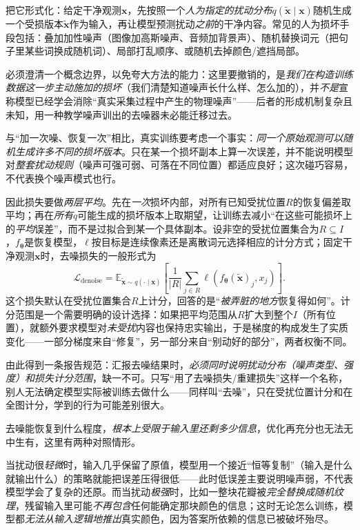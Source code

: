 把它形式化：给定干净观测$\bm{x}$，先按照一个\emph{人为指定的扰动分布}$q(\widetilde{\bm{x}}\mid\bm{x})$随机生成一个受损版本$\widetilde{\bm{x}}$作为输入，再让模型预测扰动\emph{之前}的干净内容。常见的人为损坏手段包括：叠加加性噪声（图像加高斯噪声、音频加背景声）、随机替换词元（把句子里某些词换成随机词）、局部打乱顺序、或随机去掉颜色/遮挡局部。

必须澄清一个概念边界，以免夸大方法的能力：这里要撤销的，是\emph{我们在构造训练数据这一步主动施加的损坏}（我们清楚知道噪声长什么样、怎么加的），并\emph{不是}宣称模型已经学会消除“真实采集过程中产生的物理噪声”——后者的形成机制复杂且未知，用一种教学噪声训出的去噪器未必能迁移过去。

与“加一次噪、恢复一次”相比，真实训练要考虑一个事实：\emph{同一个原始观测可以随机生成许多不同的损坏版本}。只在某一个损坏副本上算一次误差，并不能说明模型对\emph{整套扰动规则}（噪声可强可弱、可落在不同位置）都适应良好；这次碰巧容易，不代表换个噪声模式也行。

因此损失要做\emph{两层平均}。先在\emph{一次}损坏内部，对所有已知受扰位置$R$的恢复偏差取平均；再在\emph{所有}$q$可能生成的损坏版本上取期望，让训练去减小“在这些可能损坏上的\emph{平均}误差”，而不是过拟合到某一个具体副本。设非空的受扰位置集合为$R\subseteq I$，$f_{\bm{\theta}}$是恢复模型，$\ell$按目标是连续像素还是离散词元选择相应的计分方式；固定干净观测$\bm{x}$时，去噪损失的一般形式为
\begin{equation}
  \mathcal{L}_{\mathrm{denoise}}
  =\mathbb{E}_{\widetilde{\bm{x}}\sim q(\cdot\mid\bm{x})}
   \left[\frac{1}{|R|}\sum_{j\in R}\ell\!\left(f_{\bm{\theta}}(\widetilde{\bm{x}})_j,x_j\right)\right].
  \label{eq:data-derived-knowledge-denoising}
\end{equation}
这个损失默认在受扰位置集合$R$上计分，回答的是“\emph{被弄脏的地方}恢复得如何”。计分范围是一个需要明确的设计选择：如果把平均范围从$R$扩大到整个$I$（所有位置），就额外要求模型对\emph{未受扰}内容也保持忠实输出，于是梯度的构成发生了实质变化——一部分梯度来自“修复”，另一部分来自“别动好的部分”，两者权衡不同。

由此得到一条报告规范：汇报去噪结果时，\emph{必须同时说明扰动分布（噪声类型、强度）和损失计分范围}，缺一不可。只写“用了去噪损失/重建损失”这样一个名称，别人无法确定模型实际被训练去做什么——同样叫“去噪”，只在受扰位置计分和在全图计分，学到的行为可能差别很大。

去噪能恢复到什么程度，\emph{根本上受限于输入里还剩多少信息}，优化再充分也无法无中生有，这里有两种对照情形。

当扰动很\emph{轻微}时，输入几乎保留了原值，模型用一个接近“恒等复制”（输入是什么就输出什么）的策略就能把误差压得很低——此时低误差主要说明噪声弱，不代表模型学会了复杂的还原。而当扰动\emph{极强}时，比如一整块花瓣被\emph{完全替换成随机纹理}，残留输入里可能\emph{不再包含}任何能确定那块颜色的信息；这时无论怎么训练，模型都\emph{无法从输入逻辑地推出}真实颜色，因为答案所依赖的信息已被破坏殆尽。

